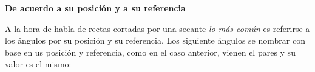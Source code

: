 \textbf{De acuerdo a su posición y a su referencia}


A la hora de habla de rectas cortadas por una secante \textit{lo más común} es 
referirse a los ángulos por su posición y su referencia.
Los siguiente ángulos se nombrar con base en us posición y referencia, como en 
el caso anterior, vienen el pares y su valor es el mismo:

